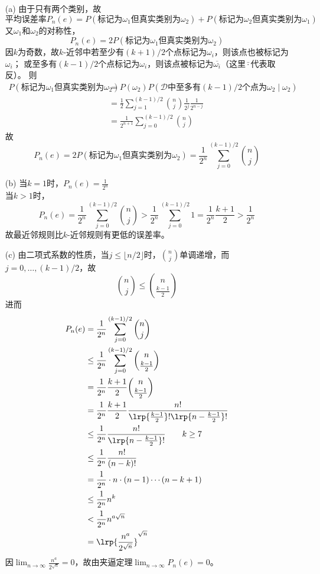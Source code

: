 \documentclass[reportComp]{thesis}
\begin{document}
\begin{answer}
\begin{itemize}
	\item[(a)] 由于只有两个类别，故
	\[\text{平均误差率}P_n(e)=P(\text{标记为$\omega_1$但真实类别为$\omega_2$})+P(\text{标记为$\omega_2$但真实类别为$\omega_1$})\]
	又$\omega_1$和$\omega_2$的对称性，
	\[P_n(e)=2P(\text{标记为$\omega_1$但真实类别为$\omega_2$})\]
	因$k$为奇数，故$k$-近邻中若至少有$(k+1)/2$个点标记为$\omega_i$，则该点也被标记为$\omega_i$；
	或至多有$(k-1)/2$个点标记为$\omega_i$，则该点被标记为$\overline{\omega_i}$（这里$\bar{\cdot}$代表取反）。
	则
	\[\begin{aligned}
	P(\text{标记为$\omega_1$但真实类别为$\omega_2$})&=P(\omega_2)P(\mathcal{D}\text{中至多有$(k-1)/2$个点为}\omega_2\mid\omega_2)\\
	&=\frac{1}{2}\sum_{j=1}^{(k-1)/2}\binom{n}{j}\frac{1}{2^j}\frac{1}{2^{n-j}}\\
	&=\frac{1}{2^{n+1}}\sum_{j=0}^{(k-1)/2}\binom{n}{j}
	\end{aligned}\]
	故
	\[P_n(e)=2P(\text{标记为$\omega_1$但真实类别为$\omega_2$})=\frac{1}{2^n}\sum_{j=0}^{(k-1)/2}\binom{n}{j}\]
	\item[(b)] 当$k=1$时，$P_n(e)=\frac{1}{2^n}$\\
	当$k>1$时，
	\[P_n(e)=\frac{1}{2^n}\sum_{j=0}^{(k-1)/2}\binom{n}{j}>\frac{1}{2^n}\sum_{j=0}^{(k-1)/2}1=\frac{1}{2^n}\frac{k+1}{2}>\frac{1}{2^n}\]
	故最近邻规则比$k$-近邻规则有更低的误差率。
	\item[(c)] 由二项式系数的性质，当$j\leq\lfloor n/2\rfloor$时，$\binom{n}{j}$单调递增，而$j=0,\ldots,(k-1)/2$，故
	\[\binom{n}{j}\leq\binom{n}{\frac{k-1}{2}}\]
	进而
	\[\begin{aligned}
	P_n(e)&=\frac{1}{2^n}\sum_{j=0}^{(k-1)/2}\binom{n}{j}\\
	&\leq\frac{1}{2^n}\sum_{j=0}^{(k-1)/2}\binom{n}{\frac{k-1}{2}}\\
	&=\frac{1}{2^n}\frac{k+1}{2}\binom{n}{\frac{k-1}{2}}\\
	&=\frac{1}{2^n}\frac{k+1}{2}\frac{n!}{\lrp{\frac{k-1}{2}}!\lrp{n-\frac{k-1}{2}}!}\\
	&\leq\frac{1}{2^n}\frac{n!}{\lrp{n-\frac{k-1}{2}}!}\qquad k\geq 7\\
	&\leq\frac{1}{2^n}\frac{n!}{(n-k)!}\\
	&=\frac{1}{2^n}\cdot n\cdot(n-1)\cdots(n-k+1)\\
	&\leq\frac{1}{2^n}n^k\\
	&<\frac{1}{2^n}n^{a\sqrt{n}}\\
	&=\lrp{\frac{n^a}{2^{\sqrt{n}}}}^{\sqrt{n}}
	\end{aligned}\]
	因$\lim_{n\to\infty}\frac{n^a}{2^{\sqrt{n}}}=0$，故由夹逼定理$\lim_{n\to\infty}P_n(e)=0$。
\end{itemize}
\end{answer}
\end{document}
